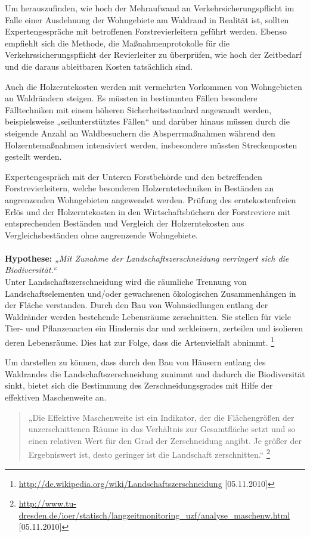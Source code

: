 \documentclass[12pt]{article}
\newcommand{\citefooturldate}[2]{\footnote{\url{#1} [#2]}}
\begin{document}
Um herauszufinden, wie hoch der Mehraufwand an Verkehrsicherungspflicht im Falle einer Ausdehnung der 
Wohngebiete am Waldrand in Realität ist, sollten Expertengespräche mit betroffenen Forstrevierleitern 
geführt werden. Ebenso empfiehlt sich die Methode, die Maßnahmenprotokolle für die Verkehrssicherungspflicht 
der Revierleiter zu überprüfen, wie hoch der Zeitbedarf und die daraus ableitbaren Kosten tatsächlich sind.


Auch die Holzerntekosten werden mit vermehrten Vorkommen von Wohngebieten an Waldrändern steigen. Es müssten
in bestimmten Fällen besondere Fälltechniken mit einem höheren Sicherheitsstandard angewandt werden, 
beispielsweise „seilunterstütztes Fällen“ und darüber hinaus müssen durch die steigende Anzahl an Waldbesuchern 
die Absperrmaßnahmen während den Holzerntemaßnahmen intensiviert werden, insbesondere müssten Streckenposten 
gestellt werden.


Expertengespräch mit der Unteren Forstbehörde und den betreffenden Forstrevierleitern, welche besonderen 
Holzerntetechniken in Beständen an angrenzenden Wohngebieten angewendet werden. Prüfung des erntekostenfreien 
Erlös und der Holzerntekosten in den Wirtschaftsbüchern der Forstreviere mit entsprechenden Beständen und 
Vergleich der Holzerntekosten aus Vergleichsbeständen ohne angrenzende Wohngebiete. \\ \\


\noindent\textbf{Hypothese:}	\textit{„Mit Zunahme der Landschaftszerschneidung verringert sich die Biodiversität.“} \\

\noindent Unter Landschaftszerschneidung wird die räumliche Trennung von Landschaftselementen und/oder gewachsenen 
ökologischen Zusammenhängen in der Fläche verstanden.
Durch den Bau von Wohnsiedlungen entlang der Waldränder werden bestehende Lebensräume zerschnitten. 
Sie stellen für viele Tier- und Pflanzenarten ein Hindernis dar und zerkleinern, zerteilen und isolieren 
deren Lebensräume. Dies hat zur Folge, dass die Artenvielfalt abnimmt. 
\citefooturldate{http://de.wikipedia.org/wiki/Landschaftszerschneidung}{05.11.2010}

Um darstellen zu können, dass durch den Bau von Häusern entlang des Waldrandes die Landschaftszerschneidung 
zunimmt und dadurch die Biodiversität sinkt, bietet sich die Bestimmung des Zerschneidungsgrades mit Hilfe 
der effektiven Maschenweite an. 

\begin{quote}
„Die Effektive Maschenweite ist ein Indikator, der die Flächengrößen der unzerschnittenen Räume in das 
Verhältnis zur Gesamtfläche setzt und so einen relativen Wert für den Grad der Zerschneidung angibt. Je 
größer der Ergebniswert ist, desto geringer ist die Landschaft zerschnitten.“
\citefooturldate{http://www.tu-dresden.de/ioer/statisch/langzeitmonitoring_uzf/analyse_maschenw.html}{05.11.2010}
\end{quote}
\end{document}
